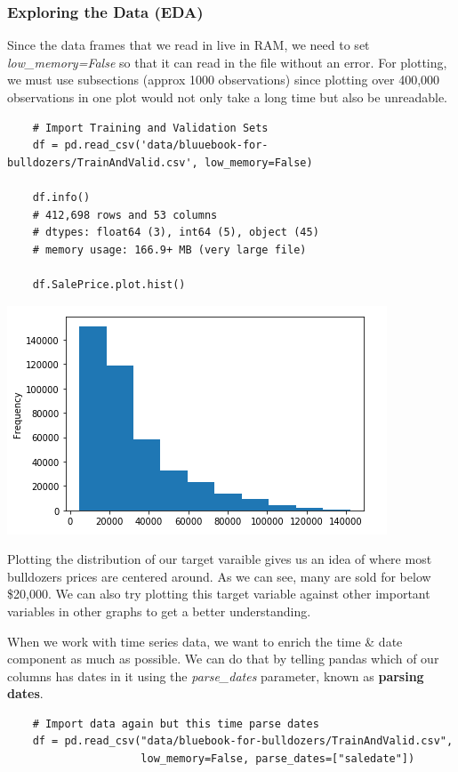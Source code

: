 \documentclass[11pt, a4paper]{article}
\begin{document}
\begin{spacing}{1.1}
	\subsubsection{Exploring the Data (EDA)}
	Since the data frames that we read in live in RAM, we need to set \textit{low\_memory=False} so that it can read in the file without an error. For plotting, we must use subsections (approx 1000 observations) since plotting over 400,000 observations in one plot would not only take a long time but also be unreadable. 
	\begin{lstlisting}
	# Import Training and Validation Sets
	df = pd.read_csv('data/bluuebook-for-bulldozers/TrainAndValid.csv', low_memory=False) 
	
	df.info() 
	# 412,698 rows and 53 columns
	# dtypes: float64 (3), int64 (5), object (45)
	# memory usage: 166.9+ MB (very large file)
	
	df.SalePrice.plot.hist() \end{lstlisting} \vspace*{1mm}
	\begin{minipage}[c]{9cm}
	\includegraphics[scale=.8]{sp_ml2}
	\end{minipage}
	\begin{minipage}[c]{8cm}
	Plotting the distribution of our target varaible gives us an idea of where most bulldozers prices are centered around. As we can see, many are sold for below \$20,000. We can also try plotting this target variable against other important variables in other graphs to get a better understanding.
	\end{minipage} \newpage

	\noindent When we work with time series data, we want to enrich the time \& date component as much as possible. We can do that by telling pandas which of our columns has dates in it using the \textit{parse\_dates} parameter, known as \textbf{parsing dates}. 
	\begin{lstlisting}
	# Import data again but this time parse dates
	df = pd.read_csv("data/bluebook-for-bulldozers/TrainAndValid.csv",
	                 low_memory=False, parse_dates=["saledate"])
	

\end{lstlisting}
\end{spacing}
\end{document}
